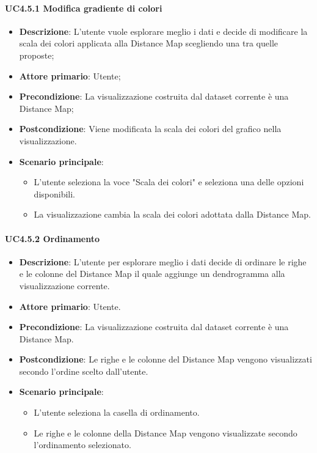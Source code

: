 \paragraph{UC4.5.1 Modifica gradiente di colori}
\label{par:uc4.5.1}
\begin{itemize}
    \item \textbf{Descrizione}: L'utente vuole esplorare meglio i dati e decide di modificare la scala dei colori applicata alla Distance Map scegliendo una tra quelle proposte;
    \item \textbf{Attore primario}: Utente;
    \item \textbf{Precondizione}: La visualizzazione costruita dal dataset corrente è una Distance Map;
    \item \textbf{Postcondizione}: Viene modificata la scala dei colori del grafico nella visualizzazione.
    \item \textbf{Scenario principale}: 
    \begin{itemize}
        \item L'utente seleziona la voce "Scala dei colori" e seleziona una delle opzioni disponibili.
        \item La visualizzazione cambia la scala dei colori adottata dalla Distance Map.
    \end{itemize}
\end{itemize}

\paragraph{UC4.5.2 Ordinamento}
\label{par:uc4.5.2}
\begin{itemize}
    \item \textbf{Descrizione}: L'utente per esplorare meglio i dati decide di ordinare le righe e le colonne del Distance Map il quale aggiunge un dendrogramma alla visualizzazione corrente.
    \item \textbf{Attore primario}: Utente.
    \item \textbf{Precondizione}: La visualizzazione costruita dal dataset corrente è una Distance Map.
    \item \textbf{Postcondizione}: Le righe e le colonne del Distance Map vengono visualizzati secondo l'ordine scelto dall'utente.
    \item \textbf{Scenario principale}: 
    \begin{itemize}
        \item L'utente seleziona la casella di ordinamento.
        \item Le righe e le colonne della Distance Map vengono visualizzate secondo l'ordinamento selezionato.
    \end{itemize}
\end{itemize}

